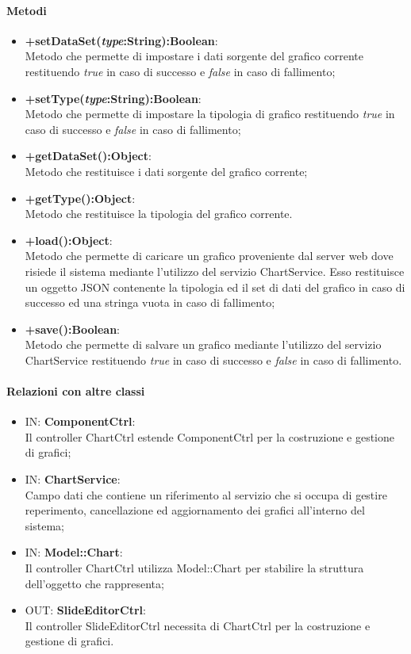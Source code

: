 \paragraph{Metodi}
\begin{itemize}
	\item \textbf{+setDataSet(\textit{type}:String):Boolean}:\\
	Metodo che permette di impostare i dati sorgente del grafico corrente restituendo \textit{true} in caso di successo e \textit{false} in caso di fallimento;
	\item \textbf{+setType(\textit{type}:String):Boolean}:\\
	Metodo che permette di impostare la tipologia di grafico restituendo \textit{true} in caso di successo e \textit{false} in caso di fallimento;
	\item \textbf{+getDataSet():Object}:\\
	Metodo che restituisce i dati sorgente del grafico corrente;
	\item \textbf{+getType():Object}:\\
	Metodo che restituisce la tipologia del grafico corrente.
	\item \textbf{+load():Object}:\\
	Metodo che permette di caricare un grafico proveniente dal server web dove risiede il sistema mediante l'utilizzo del servizio ChartService. Esso restituisce un oggetto JSON contenente la tipologia ed il set di dati del grafico in caso di successo ed una stringa vuota in caso di fallimento;
	\item \textbf{+save():Boolean}:\\
	Metodo che permette di salvare un grafico mediante l'utilizzo del servizio ChartService restituendo \textit{true} in caso di successo e \textit{false} in caso di fallimento.
	
\end{itemize}
\paragraph{Relazioni con altre classi}
\begin{itemize}
	\item IN: \textbf{ComponentCtrl}:\\
	Il controller ChartCtrl estende ComponentCtrl per la costruzione e gestione di grafici;
	\item IN: \textbf{ChartService}:\\
	Campo dati che contiene un riferimento al servizio che si occupa di gestire reperimento, cancellazione ed aggiornamento dei grafici all'interno del sistema;
	\item IN: \textbf{Model::Chart}:\\
	Il controller ChartCtrl utilizza Model::Chart per stabilire la struttura dell'oggetto che rappresenta;
	\item OUT: \textbf{SlideEditorCtrl}:\\
	Il controller SlideEditorCtrl necessita di ChartCtrl per la costruzione e gestione di grafici.
	
\end{itemize}

